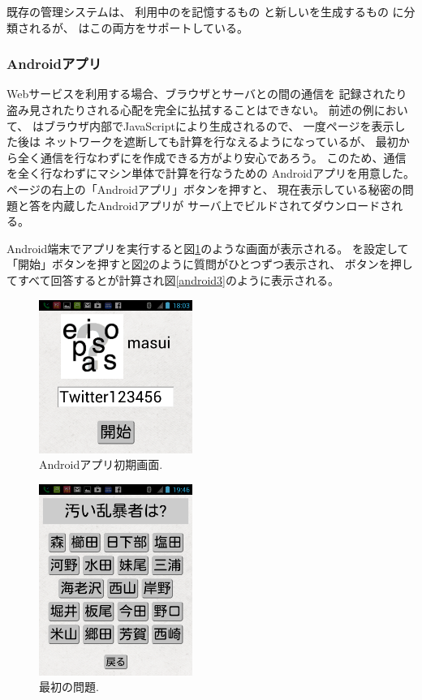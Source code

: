 \documentclass[twoside]{wiss}
\begin{document}
既存の{\PW}管理システムは、
利用中の{\PW}を記憶するもの%
\cite{OnePassword}%
\cite{Dashlane}%
\cite{ミルパス}%
\cite{LastPass}%
\cite{KeyPass}%
\cite{NortonIDSafe}%
\cite{IDManager}%
と新しい{\PW}を生成するもの%
\cite{SuperGenPass}%
に分類されるが、
{\EP}はこの両方をサポートしている。

\subsubsection{Androidアプリ}

Webサービスを利用する場合、ブラウザとサーバとの間の通信を
記録されたり盗み見されたりされる心配を完全に払拭することはできない。
前述の例において、
{\PW}はブラウザ内部でJavaScriptにより生成されるので、
一度ページを表示した後は
ネットワークを遮断しても{\PW}計算を行なえるようになっているが、
最初から全く通信を行なわずに{\PW}を作成できる方がより安心であろう。
このため、通信を全く行なわずにマシン単体で{\PW}計算を行なうための
Androidアプリを用意した。
ページの右上の「Androidアプリ」ボタンを押すと、
現在表示している秘密の問題と答を内蔵したAndroidアプリが
サーバ上でビルドされてダウンロードされる。

Android端末でアプリを実行すると図\ref{android1}のような画面が表示される。
{\SS}を設定して「開始」ボタンを押すと図\ref{android2}のように質問がひとつずつ表示され、
ボタンを押してすべて回答すると{\PW}が計算され図\ref{android3}のように表示される。

\begin{figure}[H]
\centerline{\includegraphics[width=50mm,bb=0 0 720 720]{figures/android1crop.png}}
\caption{Androidアプリ初期画面.}
\label{android1}
\end{figure}

\begin{figure}[H]
\centerline{\includegraphics[width=50mm,bb=0 0 720 900]{figures/android2crop.png}}
\caption{最初の問題.}
\label{android2}
\end{figure}
\end{document}
